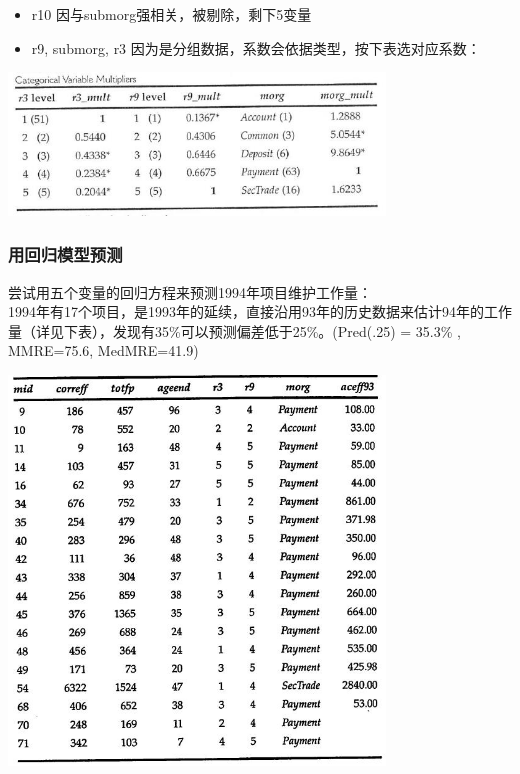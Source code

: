 \begin{itemize}
\tightlist
\item
  r10 因与submorg强相关，被剔除，剩下5变量
\item
  r9, submorg, r3 因为是分组数据，系数会依据类型，按下表选对应系数：
\end{itemize}



\includegraphics[width=10cm]{Maxwell_t514.jpg}


\hypertarget{ux7528ux56deux5f52ux6a21ux578bux9884ux6d4b}{%
\subsubsection{用回归模型预测}\label{ux7528ux56deux5f52ux6a21ux578bux9884ux6d4b}}

尝试用五个变量的回归方程来预测1994年项目维护工作量：\\
1994年有17个项目，是1993年的延续，直接沿用93年的历史数据来估计94年的工作量（详见下表），发现有35\%可以预测偏差低于25\%。(Pred(.25)
= 35.3\% , MMRE=75.6, MedMRE=41.9)


\includegraphics[width=10cm]{maxwell_t515.jpg}

